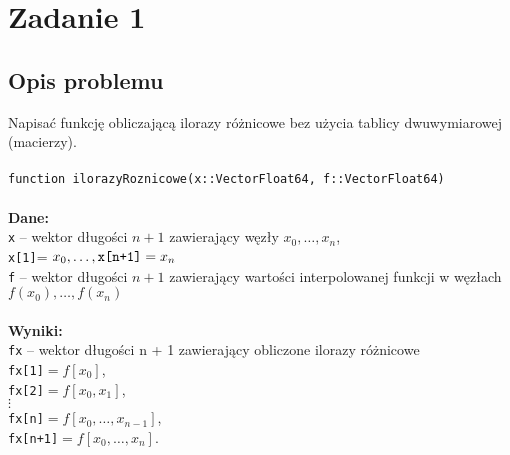 \documentclass[a4paper]{article}
\newcommand\tab[1][1cm]{\hspace*{#1}}
\begin{document}
\section{Zadanie 1}
    \subsection{Opis problemu}
    Napisać funkcję obliczającą ilorazy różnicowe bez użycia tablicy dwuwymiarowej (macierzy).\\\\
    \texttt{function ilorazyRoznicowe(x::Vector{Float64}, f::Vector{Float64})} \\\\
    \textbf{Dane:}\\
    \texttt{x} – wektor długości $n + 1$ zawierający węzły $x_0,\dots, x_n$, \\
    \tab \texttt{x[1]}= $x_0, \dots, \text{\texttt{x[n+1]}} = x_n$ \\
    \texttt{f} – wektor długości $n + 1$ zawierający wartości interpolowanej funkcji w węzłach $f(x_0),\dots, f(x_n)$ \\\\  
    \textbf{Wyniki:}\\
    \texttt{fx} – wektor długości n + 1 zawierający obliczone ilorazy różnicowe \\
    \tab \texttt{fx[1]}$ = f[x_0]$, \\
    \tab \texttt{fx[2]}$ = f[x_0, x_1]$, \\
    \tab $\vdots$\\
    \tab \texttt{fx[n]}$ = f[x_0,\dots, x_{n-1}]$,\\
    \tab \texttt{fx[n+1]}$ = f[x_0,\dots, x_n]$.\\
    
\end{document}
